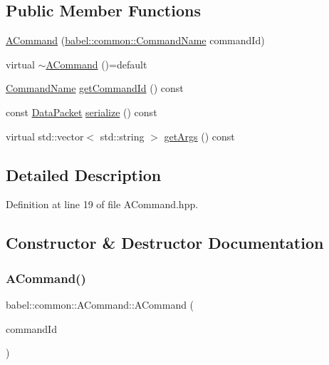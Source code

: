 \subsection*{Public Member Functions}
\begin{DoxyCompactItemize}
\item 
\mbox{\hyperlink{classbabel_1_1common_1_1_a_command_a703f2523ec5d82ae82eb041ccdac834a}{A\+Command}} (\mbox{\hyperlink{namespacebabel_1_1common_a2d31f246c776da6bf656bd71e86cbb2c}{babel\+::common\+::\+Command\+Name}} command\+Id)
\item 
virtual \mbox{\hyperlink{classbabel_1_1common_1_1_a_command_a7e461a6bff512a156e6e330c213faf16}{$\sim$\+A\+Command}} ()=default
\item 
\mbox{\hyperlink{namespacebabel_1_1common_a2d31f246c776da6bf656bd71e86cbb2c}{Command\+Name}} \mbox{\hyperlink{classbabel_1_1common_1_1_a_command_aae2b10c516ccefc465061e1ad447c86b}{get\+Command\+Id}} () const
\item 
const \mbox{\hyperlink{classbabel_1_1common_1_1_data_packet}{Data\+Packet}} \mbox{\hyperlink{classbabel_1_1common_1_1_a_command_aec2d8980c55c923c587e6970de92564a}{serialize}} () const
\item 
virtual std\+::vector$<$ std\+::string $>$ \mbox{\hyperlink{classbabel_1_1common_1_1_a_command_a67b110bc98f6c47b0739c6eba9a5432e}{get\+Args}} () const
\end{DoxyCompactItemize}


\subsection{Detailed Description}


Definition at line 19 of file A\+Command.\+hpp.



\subsection{Constructor \& Destructor Documentation}
\mbox{\label{classbabel_1_1common_1_1_a_command_a703f2523ec5d82ae82eb041ccdac834a}} 
\subsubsection{\texorpdfstring{A\+Command()}{ACommand()}}
{\footnotesize\ttfamily babel\+::common\+::\+A\+Command\+::\+A\+Command (\begin{DoxyParamCaption}\item[{\mbox{\hyperlink{namespacebabel_1_1common_a2d31f246c776da6bf656bd71e86cbb2c}{babel\+::common\+::\+Command\+Name}}}]{command\+Id }\end{DoxyParamCaption})\hspace{0.3cm}{\ttfamily [explicit]}}



